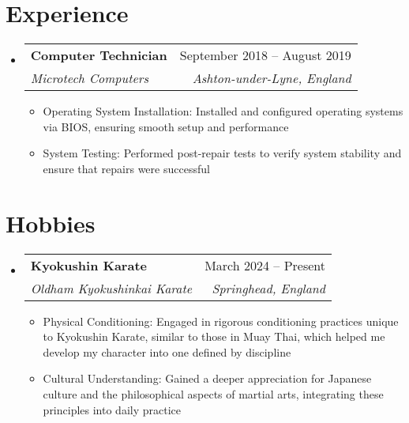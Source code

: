 \documentclass[letterpaper,11pt]{article}
\makeatletter
\newcommand{\resumeItem}[1]{
  \item\small{
    {#1 \vspace{-2pt}}
  }
}
\newcommand{\resumeSubheading}[4]{
  \vspace{-2pt}\item
    \begin{tabular*}{0.97\textwidth}[t]{l@{\extracolsep{\fill}}r}
      \textbf{#1} & #2 \\
      \textit{\small#3} & \textit{\small #4} \\
    \end{tabular*}\vspace{-7pt}
}
\newcommand{\resumeSubHeadingListStart}{\begin{itemize}[leftmargin=0.15in, label={}]}
\newcommand{\resumeSubHeadingListEnd}{\end{itemize}}
\newcommand{\resumeItemListStart}{\begin{itemize}}
\newcommand{\resumeItemListEnd}{\end{itemize}\vspace{-5pt}}
\makeatother
\begin{document}
\section{Experience}
  \resumeSubHeadingListStart
    \resumeSubheading
      {Computer Technician}{September 2018 -- August 2019}
      {Microtech Computers}{Ashton-under-Lyne, England}
      \resumeItemListStart
        \resumeItem{Operating System Installation: Installed and configured operating systems via BIOS, ensuring smooth setup and performance}
        \resumeItem{System Testing: Performed post-repair tests to verify system stability and ensure that repairs were successful }
    \resumeItemListEnd
  \resumeSubHeadingListEnd

\section{Hobbies}
  \resumeSubHeadingListStart
    \resumeSubheading
      {Kyokushin Karate}{March 2024 -- Present}
      {Oldham Kyokushinkai Karate}{Springhead, England}
      \resumeItemListStart
        \resumeItem{Physical Conditioning: Engaged in rigorous conditioning practices unique to Kyokushin Karate, similar to those in Muay Thai, which helped me develop my character into one defined by discipline} 
        \resumeItem{Cultural Understanding: Gained a deeper appreciation for Japanese culture and the philosophical aspects of martial arts, integrating these principles into daily practice}
      \resumeItemListEnd
  \resumeSubHeadingListEnd
\end{document}
